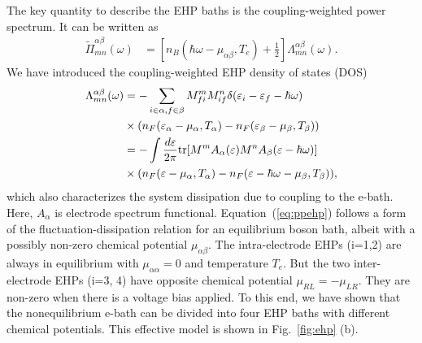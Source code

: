\documentclass[aps,prb,
,floatfix,footinbib,shortbibliography,
preprint
]{revtex4-1}
\begin{document}
The key quantity to describe the EHP baths is the coupling-weighted power spectrum. It can be written as
\begin{align}
\tilde{\Pi}_{mn}^{\alpha\beta}(\omega) &= \left[n_B(\hbar\omega-\mu_{\alpha\beta},T_e)+\frac{1}{2}\right]\Lambda_{mn}^{\alpha\beta}(\omega).
\label{eq:ppehp}
\end{align}
We have introduced the coupling-weighted EHP density of states (DOS)\cite{lu_current-induced_2012,lu2016electron}
\begin{align}
\Lambda_{mn}^{\alpha\beta}(\omega) &= -\sum_{i\in\alpha,f\in\beta}M^{m}_{fi}M^n_{if}  \delta(\varepsilon_i-\varepsilon_f-\hbar\omega)\nonumber\\
&\times (n_F(\varepsilon_\alpha-\mu_\alpha,T_\alpha)-n_F(\varepsilon_\beta-\mu_\beta,T_\beta))\nonumber\\
&=-\int \frac{d\varepsilon}{2\pi} {\rm tr}[M^m A_\alpha(\varepsilon) M^n A_\beta(\varepsilon-\hbar\omega)] \nonumber\\
&\times (n_F(\varepsilon-\mu_\alpha,T_\alpha)-n_F(\varepsilon-\hbar\omega-\mu_\beta,T_\beta)),
\label{eq:gamma}
\end{align}
which also characterizes the system dissipation due to coupling to the e-bath\cite{lu_current-induced_2012}. Here, $A_\alpha$ is electrode spectrum functional.
Equation~(\ref{eq:ppehp}) follows a form of the fluctuation-dissipation relation for an equilibrium boson bath, albeit with a possibly non-zero chemical potential  $\mu_{\alpha\beta}$. The intra-electrode EHPs (i=1,2) are always in equilibrium with $\mu_{\alpha\alpha}=0$ and temperature $T_e$. But the two inter-electrode EHPs (i=3, 4) have opposite chemical potential $\mu_{RL}=-\mu_{LR}$. They are non-zero when there is a voltage bias applied.  To this end, we have shown that the nonequilibrium e-bath can be divided into four EHP baths with different chemical potentials.
This effective model is shown in Fig.~\ref{fig:ehp} (b).
\end{document}
